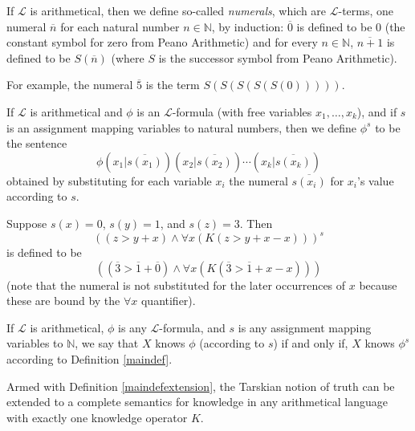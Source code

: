 \documentclass[runningheads]{llncs}
\begin{document}
\begin{definition}
  If $\mathscr L$ is arithmetical, then we define so-called \emph{numerals}, which
  are $\mathscr L$-terms, one numeral $\overline n$ for each natural number $n\in\mathbb N$,
  by induction: $\overline 0$ is defined to be $0$ (the constant symbol for zero from
  Peano Arithmetic) and
  for every $n\in\mathbb N$, $\overline{n+1}$ is defined to be $S(\overline n)$
  (where $S$ is the successor symbol from Peano Arithmetic).
\end{definition}

For example, the numeral $\overline 5$ is the term $S(S(S(S(S(0)))))$.

\begin{definition}
  If $\mathscr L$ is arithmetical and $\phi$ is an $\mathscr L$-formula (with free variables
  $x_1,\ldots,x_k$),
  and if $s$ is an assignment mapping variables to natural numbers, then we define $\phi^s$
  to be the sentence
  \[
    \phi(x_1|\overline{s(x_1)})(x_2|\overline{s(x_2)})\cdots (x_k|\overline{s(x_k)})
  \]
  obtained by substituting for each variable $x_i$ the numeral $\overline{s(x_i)}$
  for $x_i$'s value according to $s$.
\end{definition}

\begin{example}
  Suppose $s(x)=0$, $s(y)=1$, and $s(z)=3$. Then
  \[
  ((z>y+x) \wedge \forall x(K(z>y+x-x)))^s
  \]
  is defined to be
  \[
  ((\overline 3 > \overline 1+\overline 0)
  \wedge \forall x( K( \overline 3 > \overline 1 + x - x ) ))
  \]
  (note that the numeral is not substituted for the later occurrences of $x$ because
  these are bound by the $\forall x$ quantifier).
\end{example}

\begin{definition}
\label{maindefextension}
  If $\mathscr L$ is arithmetical, $\phi$ is any $\mathscr L$-formula,
  and $s$ is any assignment mapping variables to $\mathbb N$,
  we say that $X$ knows $\phi$ (according to $s$) if and only if,
  $X$ knows $\phi^s$ according to Definition \ref{maindef}.
\end{definition}

Armed with Definition \ref{maindefextension}, the Tarskian notion
\cite{sep-tarski-truth} of
truth can be extended to a complete semantics for
knowledge in any arithmetical language with exactly one knowledge operator $K$.
\end{document}
